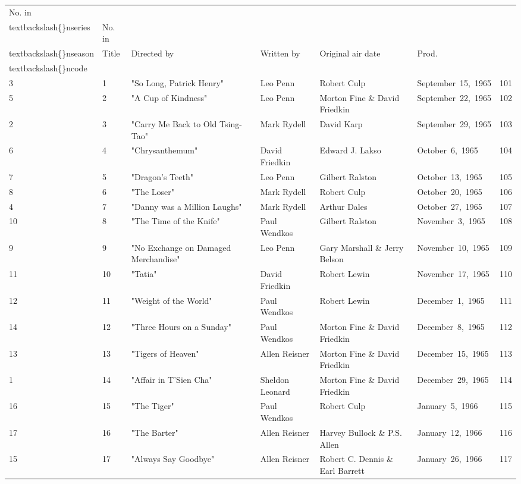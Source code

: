 \documentclass{article}
\begin{document}
\begin{tabular}{lllllll}
\toprule
No. in\\textbackslash\{\}nseries & No. in\\textbackslash\{\}nseason & Title & Directed by & Written by & Original air date & Prod.\\textbackslash\{\}ncode \\
\midrule
3 & 1 & "So Long, Patrick Henry" & Leo Penn & Robert Culp & September 15, 1965 & 101 \\
5 & 2 & "A Cup of Kindness" & Leo Penn & Morton Fine \& David Friedkin & September 22, 1965 & 102 \\
2 & 3 & "Carry Me Back to Old Tsing-Tao" & Mark Rydell & David Karp & September 29, 1965 & 103 \\
6 & 4 & "Chrysanthemum" & David Friedkin & Edward J. Lakso & October 6, 1965 & 104 \\
7 & 5 & "Dragon's Teeth" & Leo Penn & Gilbert Ralston & October 13, 1965 & 105 \\
8 & 6 & "The Loser" & Mark Rydell & Robert Culp & October 20, 1965 & 106 \\
4 & 7 & "Danny was a Million Laughs" & Mark Rydell & Arthur Dales & October 27, 1965 & 107 \\
10 & 8 & "The Time of the Knife" & Paul Wendkos & Gilbert Ralston & November 3, 1965 & 108 \\
9 & 9 & "No Exchange on Damaged Merchandise" & Leo Penn & Gary Marshall \& Jerry Belson & November 10, 1965 & 109 \\
11 & 10 & "Tatia" & David Friedkin & Robert Lewin & November 17, 1965 & 110 \\
12 & 11 & "Weight of the World" & Paul Wendkos & Robert Lewin & December 1, 1965 & 111 \\
14 & 12 & "Three Hours on a Sunday" & Paul Wendkos & Morton Fine \& David Friedkin & December 8, 1965 & 112 \\
13 & 13 & "Tigers of Heaven" & Allen Reisner & Morton Fine \& David Friedkin & December 15, 1965 & 113 \\
1 & 14 & "Affair in T'Sien Cha" & Sheldon Leonard & Morton Fine \& David Friedkin & December 29, 1965 & 114 \\
16 & 15 & "The Tiger" & Paul Wendkos & Robert Culp & January 5, 1966 & 115 \\
17 & 16 & "The Barter" & Allen Reisner & Harvey Bullock \& P.S. Allen & January 12, 1966 & 116 \\
15 & 17 & "Always Say Goodbye" & Allen Reisner & Robert C. Dennis \& Earl Barrett & January 26, 1966 & 117 \\

\end{tabular}
\end{document}
